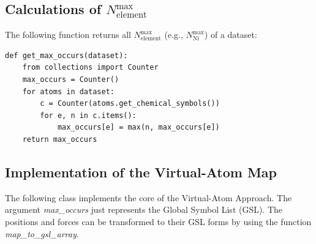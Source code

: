 \documentclass[final,1p,times]{elsarticle}
\begin{document}
% 
%
\subsection{
    Calculations of 
    \texorpdfstring{$N_{\mathrm{element}}^{\mathrm{max}}$}{Nelmax} 
}

The following function returns all $N_{\mathrm{element}}^{\mathrm{max}}$ (e.g., 
$N_{\mathrm{Ni}}^{\mathrm{max}}$) of a dataset:
\begin{verbatim}
def get_max_occurs(dataset):
    from collections import Counter
    max_occurs = Counter()
    for atoms in dataset:
        c = Counter(atoms.get_chemical_symbols())
        for e, n in c.items():
            max_occurs[e] = max(n, max_occurs[e])
    return max_occurs
\end{verbatim}

% 
%
\subsection{Implementation of the Virtual-Atom Map}

The following class implements the core of the Virtual-Atom Approach. The 
argument \textit{max\_occurs} just represents the Global Symbol List (GSL). The
positions and forces can be transformed to their GSL forms by using the function
\textit{map\_to\_gsl\_array}.
\end{document}
